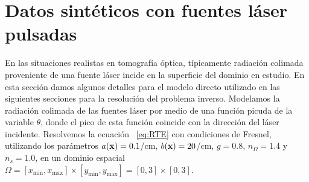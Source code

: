 \section{Datos sintéticos con fuentes láser pulsadas} 
\label{sec:sintetic} 

En las situaciones realistas en tomografía óptica, típicamente 
radiación colimada proveniente de una fuente láser incide en 
la superficie del dominio en estudio. En esta sección damos 
algunos detalles para el modelo directo utilizado  
en las siguientes secciones para la resolución del problema inverso. 
Modelamos la radiación colimada de las fuentes láser por medio 
de una función picuda de la variable $\theta$, donde el pico 
de esta función coincide con la dirección del láser incidente. 
Resolvemos la ecuación~ \eqref{eq:RTE} con condiciones de Fresnel, 
utilizando los parámetros $a(\mathbf{x})=0.1$/cm, $b(\mathbf{x})=20$/cm, $g=0.8$, 
$n_{\Omega}=1.4$ y $n_s=1.0$, en un dominio espacial $\Omega=[x_{\text{min}},x_{\text{max}}]\times[y_{\text{min}},y_{\text{max}}]=[0,3]\times[0,3]$. 

